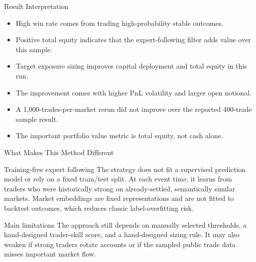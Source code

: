\documentclass[11pt,aspectratio=169]{beamer}
\begin{document}
\begin{frame}{Result Interpretation}
  \begin{itemize}
    \item High win rate comes from trading high-probability stable outcomes.
    \item Positive total equity indicates that the expert-following filter adds value over this sample.
    \item Target exposure sizing improves capital deployment and total equity in this run.
    \item The improvement comes with higher PnL volatility and larger open notional.
    \item A 1,000-trades-per-market rerun did not improve over the reported 400-trade sample result.
    \item The important portfolio value metric is total equity, not cash alone.
  \end{itemize}
\end{frame}

\begin{frame}{What Makes This Method Different}
  \begin{block}{Training-free expert following}
    The strategy does not fit a supervised prediction model or rely on a fixed train/test split.
    At each event time, it learns from traders who were historically strong on already-settled,
    semantically similar markets. Market embeddings are fixed representations and are not fitted
    to backtest outcomes, which reduces classic label-overfitting risk.
  \end{block}

  \vspace{0.2cm}
  \begin{block}{Main limitations}
    The approach still depends on manually selected thresholds, a hand-designed trader-skill score,
    and a hand-designed sizing rule. It may also weaken if strong traders rotate accounts or if the
    sampled public trade data misses important market flow.
  \end{block}
\end{frame}
\end{document}
